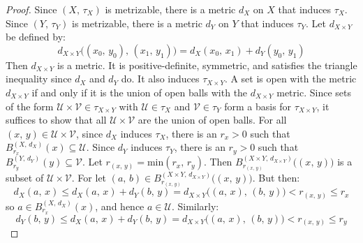 \documentclass{article}
\theoremstyle{plain}
\theoremstyle{normal}
\begin{document}
        \begin{proof}
            Since $(X,\,\tau_{X})$ is metrizable, there is a metric $d_{X}$
            on $X$ that induces $\tau_{X}$. Since $(Y,\,\tau_{Y})$ is
            metrizable, there is a metric $d_{Y}$ on $Y$ that induces
            $\tau_{Y}$. Let $d_{X\times{Y}}$ be defined by:
            \begin{equation}
                d_{X\times{Y}}\big((x_{0},\,y_{0}),\,(x_{1},\,y_{1})\big)
                =d_{X}(x_{0},\,x_{1})+d_{Y}(y_{0},\,y_{1})
            \end{equation}
            Then $d_{X\times{Y}}$ is a metric. It is positive-definite,
            symmetric, and satisfies the triangle inequality since
            $d_{X}$ and $d_{Y}$ do. It also induces $\tau_{X\times{Y}}$.
            A set is open with the metric $d_{X\times{Y}}$ if and only if
            it is the union of open balls with the
            $d_{X\times{Y}}$ metric. Since sets of the form
            $\mathcal{U}\times\mathcal{V}\in\tau_{X\times{Y}}$ with
            $\mathcal{U}\in\tau_{X}$ and $\mathcal{V}\in\tau_{Y}$ form a basis
            for $\tau_{X\times{Y}}$, it suffices to show that all
            $\mathcal{U}\times\mathcal{V}$ are the union of open balls.
            For all $(x,\,y)\in\mathcal{U}\times\mathcal{V}$, since
            $d_{X}$ induces $\tau_{X}$, there is an $r_{x}>0$ such that
            $B_{r_{x}}^{(X,\,d_{X})}(x)\subseteq\mathcal{U}$. Since
            $d_{Y}$ induces $\tau_{Y}$, there is an $r_{y}>0$ such that
            $B_{r_{y}}^{(Y,\,d_{Y})}(y)\subseteq\mathcal{V}$. Let
            $r_{(x,\,y)}=\textrm{min}(r_{x},\,r_{y})$. Then
            $B_{r_{(x,\,y)}}^{(X\times{Y},\,d_{X\times{Y}})}\big((x,\,y)\big)$
            is a subset of $\mathcal{U}\times\mathcal{V}$. For let
            $(a,\,b)\in{B}_{r_{(x,\,y)}}^{(X\times{Y},\,d_{X\times{Y}})}\big((x,\,y)\big)$.
            But then:
            \begin{equation}
                d_{X}(a,\,x)
                \leq{d}_{X}(a,\,x)+d_{Y}(b,\,y)
                =d_{X\times{Y}}\big((a,\,x),\,(b,\,y)\big)
                <r_{(x,\,y)}\leq{r}_{x}
            \end{equation}
            so $a\in{B}_{r_{x}}^{(X,\,d_{X})}(x)$, and hence
            $a\in\mathcal{U}$. Similarly:
            \begin{equation}
                d_{Y}(b,\,y)
                \leq{d}_{X}(a,\,x)+d_{Y}(b,\,y)
                =d_{X\times{Y}}\big((a,\,x),\,(b,\,y)\big)
                <r_{(x,\,y)}\leq{r}_{y}

\end{equation}
\end{proof}
\end{document}
